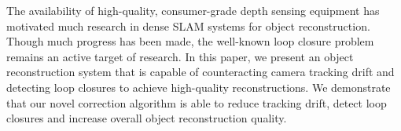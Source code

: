 The availability of high-quality, consumer-grade depth sensing equipment has motivated much research in dense SLAM systems for
object reconstruction. Though much progress has been made, the well-known loop closure problem remains an active target of research.
In this paper, we present an object reconstruction system that is capable of counteracting camera tracking drift and detecting loop
closures to achieve high-quality reconstructions.
We demonstrate that our novel correction algorithm is able to reduce tracking drift, detect loop closures and increase overall
object reconstruction quality.